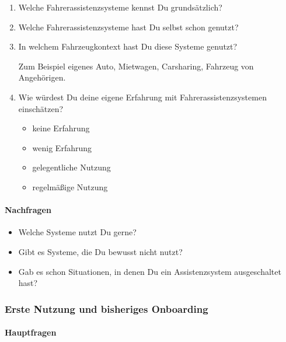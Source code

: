 \begin{enumerate}
    \item Welche Fahrerassistenzsysteme kennst Du grundsätzlich?

    \item Welche Fahrerassistenzsysteme hast Du selbst schon genutzt?

    \item In welchem Fahrzeugkontext hast Du diese Systeme genutzt?

    Zum Beispiel eigenes Auto, Mietwagen, Carsharing, Fahrzeug von
    Angehörigen.

    \item Wie würdest Du deine eigene Erfahrung mit
    Fahrerassistenzsystemen einschätzen?

    \begin{itemize}
        \item keine Erfahrung
        \item wenig Erfahrung
        \item gelegentliche Nutzung
        \item regelmäßige Nutzung
    \end{itemize}
\end{enumerate}

\paragraph*{Nachfragen}

\begin{itemize}
    \item Welche Systeme nutzt Du gerne?
    \item Gibt es Systeme, die Du bewusst nicht nutzt?
    \item Gab es schon Situationen, in denen Du ein Assistenzsystem
          ausgeschaltet hast?
\end{itemize}


\subsubsection{Erste Nutzung und bisheriges Onboarding}

\paragraph*{Hauptfragen}

